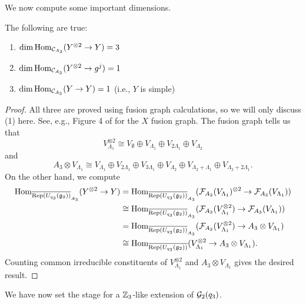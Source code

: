We now compute some important dimensions.
\begin{proposition}\label{prop:level-3-fusion}
    The following are true:
    \begin{enumerate}
        \item $\dim\operatorname{Hom}_{\mathcal{C}_{A_3}}(Y^{\otimes2}\to Y)=3$
        \item $\dim\operatorname{Hom}_{\mathcal{C}_{A_3}}(Y^{\otimes2}\to g^j)=1$
        \item $\dim\operatorname{Hom}_{\mathcal{C}_{A_3}}(Y\to Y)=1$ (i.e., $Y$ is simple)
    \end{enumerate}
\end{proposition}
\begin{proof}
    All three are proved using fusion graph calculations, so we will only discuss (1) here.
    See, e.g., Figure 4 of \cite{spectral_measures_G2} for the $X$ fusion graph. 
    The fusion graph tells us that 
    \[
    V_{\Lambda_1}^{\otimes2} \cong V_\emptyset \oplus V_{\Lambda_1} \oplus V_{2\Lambda_1} \oplus V_{\Lambda_2}
    \]
    and
    \[
    A_3 \otimes V_{\Lambda_1} 
    \cong V_{\Lambda_1} \oplus V_{2\Lambda_1} \oplus  V_{3\Lambda_1} 
    \oplus V_{\Lambda_2} \oplus V_{\Lambda_2+\Lambda_1} \oplus V_{\Lambda_2+2\Lambda_1}.
    \]
    On the other hand, we compute
    \begin{align*}
        \operatorname{Hom}_{\overline{\operatorname{Rep}(U_{q_3}(\mathfrak{g}_2))}_{A_3}}(Y^{\otimes2} \to Y) & = \operatorname{Hom}_{\overline{\operatorname{Rep}(U_{q_3}(\mathfrak{g}_2))}_{A_3}}( \mathcal{F}_{A_3}(V_{\Lambda_1})^{\otimes 2} \to \mathcal{F}_{A_3}(V_{\Lambda_1})) \\
        & \cong \operatorname{Hom}_{\overline{\operatorname{Rep}(U_{q_3}(\mathfrak{g}_2))}_{A_3}}( \mathcal{F}_{A_3}(V_{\Lambda_1}^{\otimes 2}) \to \mathcal{F}_{A_3}(V_{\Lambda_1})) \\
        & = \operatorname{Hom}_{\overline{\operatorname{Rep}(U_{q_3}(\mathfrak{g}_2))}_{A_3}}( \mathcal{F}_{A_3}(V_{\Lambda_1}^{\otimes 2}) \to A_3 \otimes V_{\Lambda_1}) \\
        & \cong \operatorname{Hom}_{\overline{\operatorname{Rep}(U_{q_3}(\mathfrak{g}_2))}}( V_{\Lambda_1}^{\otimes 2} \to A_3 \otimes V_{\Lambda_1}). \\
    \end{align*}
    Counting common irreducible constituents of $V_{\Lambda_1}^{\otimes2}$ and 
    $A_3 \otimes V_{\Lambda_1}$ gives the desired result.
\end{proof}

We have now set the stage for a $\mathbb{Z}_3$-like extension of $\mathcal{G}_2(q_3)$.






